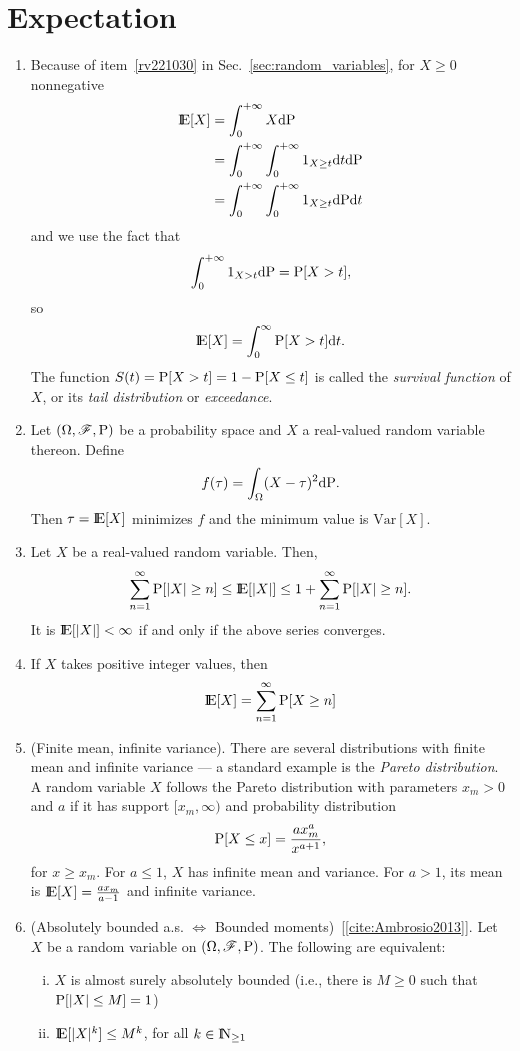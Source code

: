 \documentclass[a4paper,10pt]{article}
\begin{document}
\section{Expectation}
\begin{enumerate}  

\item 
 \label{gx1312}
 Because of item~\ref{rv221030} in Sec.~\ref{sec:random_variables}, for $X\geq 0$ nonnegative 
 \begin{align*}
  \E[X] &= \int_{0}^{+\infty} X \d \prob\\
        &= \int_{0}^{+\infty} \int_0^{+\infty} 1_{X\geq t}\d t \d \prob\\
        &= \int_{0}^{+\infty} \int_0^{+\infty} 1_{X\geq t} \d \prob \d t
 \end{align*}
 and we use the fact that 
 \[
  \int_{0}^{+\infty} 1_{X>t}\mathrm{d} \mathrm{P} = \mathrm{P}[X>t],
 \]
 so
 \[
  \E[X] = \int_0^\infty \prob[X>t]\d t.
 \]
 The function $S(t) = \mathrm{P}[X>t] = 1-\mathrm{P}[X\leq t]$ is called the \textit{survival function} 
 of $X$, or its \textit{tail distribution} or \textit{exceedance}.

 \item Let $(\Omega,\mathscr{F},\mathrm{P})$ be a probability space and $X$ a real-valued random variable thereon. Define 
 \[
  f(\tau) = \int_{\Omega}(X-\tau)^2\mathrm{d}\mathrm{P}.
 \]
 Then $\tau = \E[X]$ minimizes $f$ and the minimum value is $\mathrm{Var}[X]$.
 \item Let $X$ be a real-valued random variable. Then,
 \[
  \sum_{n=1}^{\infty}\prob[|X|\geq n] \leq \E[|X|] \leq 1+ \sum_{n=1}^{\infty}\prob[|X|\geq n].
 \]
 It is $\E[|X|]<\infty$ if and only if the above series converges.
 \item If $X$ takes positive integer values, then
 \[
  \E[X] = \sum_{n=1}^{\infty}\prob[X\geq n]
 \]

 \item (Finite mean, infinite variance). There are several distributions with finite mean 
       and infinite variance --- a standard example is the \textit{Pareto distribution}.
       A random variable $X$ follows the Pareto distribution with parameters $x_m>0$ and $a$
       if it has support $[x_m,\infty)$ and probability distribution
       \[
        \mathrm{P}[X\leq x] = \frac{ax_m^a}{x^{a+1}},
       \]
       for $x\geq x_m$. For $a\leq 1$, $X$ has infinite mean and variance. For $a>1$, its
       mean is $\E[X]=\frac{ax_m}{a-1}$ and infinite variance.
       
 \item (Absolutely bounded a.s. $\Leftrightarrow$ Bounded moments)~[\ref{cite:Ambrosio2013}].
	Let $X$ be a random variable on $(\Omega,\mathscr{F},\mathrm{P})$. The following are equivalent:
	\begin{enumerate}[i.]
	  \item $X$ is almost surely absolutely bounded (i.e., there is $M\geq 0$ such that $\mathrm{P}[|X|\leq M]=1$)
	  \item $\E[|X|^k]\leq M^k$, for all $k\in \N_{\geq 1}$
	\end{enumerate}


\end{enumerate}
\end{document}

